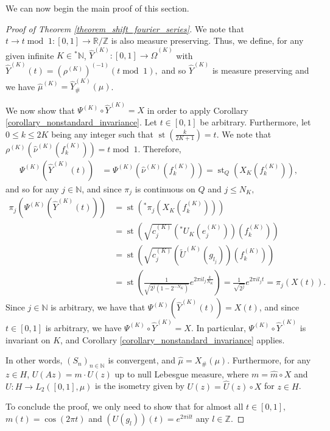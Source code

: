\documentclass{amsart}
\theoremstyle{definition}
\theoremstyle{remark}
\def \St{\operatorname{st}}
\def \HOM{\hat{\Omega}}
\def \HMU{\hat{\mu}}
\def \HNU{\hat{\nu}}
\def \HU{\hat{U}}
\def \Hm{\hat{m}}
\begin{document}
We can now begin the main proof of this section.

\begin{proof}[Proof of Theorem \ref{theorem_shift_fourier_series}]
	We note that $t\rightarrow t\operatorname{mod}\;1: [0,1]\rightarrow \mathbb{R}/\mathbb{Z}$ is also measure preserving. Thus, we define, for any given infinite $K\in{}^*\mathbb{N}$, $\hat{Y}^{(K)}:[0,1]\rightarrow \HOM^{(K)}$ with $\hat{Y}^{(K)}(t)=(\rho^{(K)})^{(-1)}(t\operatorname{mod}\;1),$  and so $\hat{Y}^{(K)}$ is measure preserving and we have $\HMU^{(K)}=\hat{Y}^{(K)}_{\#}(\mu)$.
	
	We now show that $\Psi^{(K)}\circ \hat{Y}^{(K)}=X$ in order to apply Corollary \ref{corollary_nonstandard_invariance}. Let $t\in[0,1]$ be arbitrary.  Furthermore, let $0\leq k\leq 2K$ being any integer such that $\St(\frac{k}{2K+1})=t$. We note that $\rho^{(K)}(\HNU^{(K)}(f_k^{(K)}))=t\operatorname{mod}\;1.$ Therefore,
	\begin{align*}
		\Psi^{(K)}(\hat{Y}^{(K)}(t))&=\Psi^{(K)}(\HNU^{(K)}(f_k^{(K)}))=\St_Q(X_K(f_k^{(K)})),
	\end{align*}
	and so for any $j\in\mathbb{N}$, and since $\pi_j$ is continuous on $Q$ and $j\leq N_K,$
	\begin{align*}
		\pi_j(\Psi^{(K)}(\hat{Y}^{(K)}(t)))&=\St({}^*\pi_j(X_K(f_k^{(K)})))\\
		&=\St\left(\sqrt{c_j^{(K)}}\left({}^*U_K(e_j^{(K)})\right)(f_k^{(K)})\right)\\	&=\St\left(\sqrt{c_j^{(K)}}\left(\tilde{U}^{(K)}(g_{l_j})\right)(f_k^{(K)})\right)\\
		&=\St\left(\frac{1}{\sqrt{2^j(1-2^{-N_K})}}e^{2\pi il_j \frac{k}{N_K}}\right)=\frac{1}{\sqrt{2^j}}e^{2\pi i l_j t}=\pi_j(X(t)).
	\end{align*}
	Since $j\in\mathbb{N}$ is arbitrary, we have that $\Psi^{(K)}(\hat{Y}^{(K)}(t))=X(t)$, and since $t\in[0,1]$ is arbitrary, we have $\Psi^{(K)}\circ \hat{Y}^{(K)}=X$. In particular, $\Psi^{(K)}\circ \hat{Y}^{(K)}$ is invariant on $K$, and Corollary \ref{corollary_nonstandard_invariance} applies.
	
	In other words, $(S_n)_{n\in\mathbb{N}}$ is convergent, and $\HMU=X_{\#}(\mu)$. Furthermore, for any $z\in H$, $U(Az)=m\cdot U(z)$ up to null Lebesgue measure, where $m=\Hm\circ X$  and $U:H\rightarrow L_2([0,1],\mu)$ is the isometry given by $U(z)=\HU(z)\circ X$ for $z\in H$. 
	
	To conclude the proof, we only need to show that for almost all $t\in[0,1],$ $m(t)=\cos(2\pi t)$ and $(U(g_l))(t)=e^{2\pi il t}$  any $l\in\mathbb{Z}$.
	

\end{proof}
\end{document}
